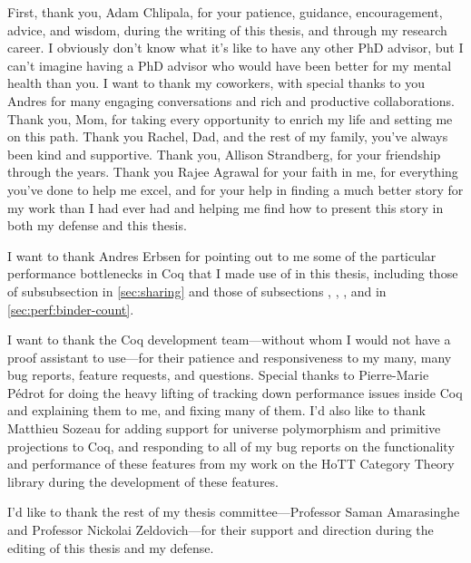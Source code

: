 First, thank you, Adam Chlipala, for your patience, guidance, encouragement, advice, and wisdom, during the writing of this thesis, and through my research career.
I obviously don't know what it's like to have any other PhD advisor, but I can't imagine having a PhD advisor who would have been better for my mental health than you.
I want to thank my coworkers, with special thanks to you Andres for many engaging conversations and rich and productive collaborations.
Thank you, Mom, for taking every opportunity to enrich my life and setting me on this path.
Thank you Rachel, Dad, and the rest of my family, you've always been kind and supportive.
Thank you, Allison Strandberg, for your friendship through the years.
Thank you Rajee Agrawal for your faith in me, for everything you've done to help me excel, and for your help in finding a much better story for my work than I had ever had and helping me find how to present this story in both my defense and this thesis.

I want to thank Andres Erbsen for pointing out to me some of the particular performance bottlenecks in Coq that I made use of in this thesis, including those of subsubsection  in \autoref{sec:sharing} and those of subsections , , , and  in \autoref{sec:perf:binder-count}.

I want to thank the Coq development team---without whom I would not have a proof assistant to use---for their patience and responsiveness to my many, many bug reports, feature requests, and questions.
Special thanks to Pierre-Marie Pédrot for doing the heavy lifting of tracking down performance issues inside Coq and explaining them to me, and fixing many of them.
I'd also like to thank Matthieu Sozeau for adding support for universe polymorphism and primitive projections to Coq, and responding to all of my bug reports on the functionality and performance of these features from my work on the HoTT Category Theory library during the development of these features.

I'd like to thank the rest of my thesis committee---Professor Saman Amarasinghe and Professor Nickolai Zeldovich---for their support and direction during the editing of this thesis and my defense.

